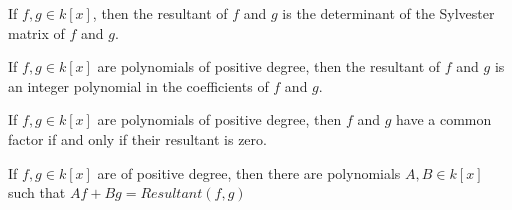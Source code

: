\documentclass[crop=false,class=article,oneside]{standalone}
\begin{document}
    \begin{theorem}
    If $f,g \in k[x]$, then the resultant of $f$ and $g$ is the determinant of the Sylvester matrix of $f$ and $g$.
    \end{theorem}
    \begin{theorem}
    If $f,g\in k[x]$ are polynomials of positive degree, then the resultant of $f$ and $g$ is an integer polynomial in the coefficients of $f$ and $g$.
    \end{theorem}
    \begin{theorem}
    If $f,g\in k[x]$ are polynomials of positive degree, then $f$ and $g$ have a common factor if and only if their resultant is zero.
    \end{theorem}
    \begin{theorem}
    If $f,g\in k[x]$ are of positive degree, then there are polynomials $A,B \in k[x]$ such that $Af + Bg = Resultant(f,g)$
    \end{theorem}
\end{document}
